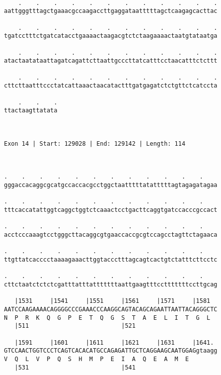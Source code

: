 \documentclass{article}
\begin{document}
\begin{Verbatim}
  
    .    .    .    .    .    .    .    .    .    .    .    .
aattgggtttagctgaaacgccaagaccttgaggataatttttagctcaagagcacttac
                                                            
    .    .    .    .    .    .    .    .    .    .    .    .
tgatcctttctgatcatacctgaaaactaagacgtctctaagaaaactaatgtataatga
                                                            
    .    .    .    .    .    .    .    .    .    .    .    .
atactaatataattagatcagattcttaattgcccttatcatttcctaacatttctcttt
                                                            
    .    .    .    .    .    .    .    .    .    .    .    .
cttcttaatttccctatcattaaactaacatactttgatgagatctctgttctcatccta
                                                            
    .    .    .
ttactaagttatata
               
               
 
Exon 14 | Start: 129028 | End: 129142 | Length: 114



.    .    .    .    .    .    .    .    .    .    .    .    
gggaccacaggcgcatgccaccacgcctggctaatttttatatttttagtagagatagaa
                                                            
.    .    .    .    .    .    .    .    .    .    .    .    
tttcaccatattggtcaggctggtctcaaactcctgacttcaggtgatccacccgccact
                                                            
.    .    .    .    .    .    .    .    .    .    .    .    
acctcccaaagtcctgggcttacaggcgtgaaccaccgcgtccagcctagttctagaaca
                                                            
.    .    .    .    .    .    .    .    .    .    .    .    
ttgttatcacccctaaaagaaacttggtaccctttagcagtcactgtctatttcttcctc
                                                            
.    .    .    .    .    .    .    .    .    .    .    .    
cttctaatctctctcgatttatttatttttttaattgaagtttcctttttttccttgcag
                                                            
   |1531     |1541     |1551     |1561     |1571     |1581  
AATCCAAGAAAACAGGGGCCCGAAACCCAAGGCAGTACAGCAGAATTAATTACAGGGCTC
N  P  R  K  Q  G  P  E  T  Q  G  S  T  A  E  L  I  T  G  L  
   |511                          |521                       
  
   |1591     |1601     |1611     |1621     |1631     |1641. 
GTCCAACTGGTCCCTCAGTCACACATGCCAGAGATTGCTCAGGAAGCAATGGAGgtaagg
V  Q  L  V  P  Q  S  H  M  P  E  I  A  Q  E  A  M  E        
   |531                          |541                       
  

\end{Verbatim}
\end{document}
